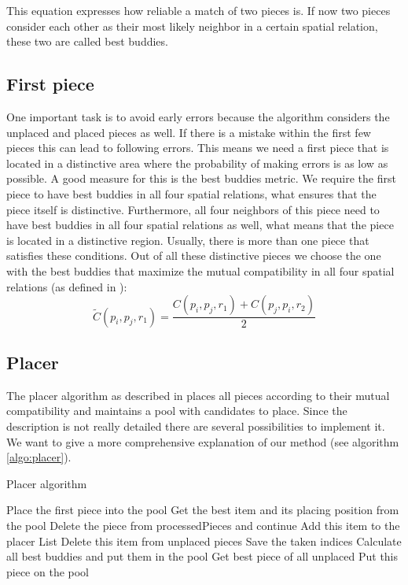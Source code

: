 \documentclass[11pt]{report}
\begin{document}
This equation expresses how reliable a match of two pieces is. If now two pieces consider each other as their most likely neighbor in a certain spatial relation, these two are called best buddies.

\subsection{First piece}
One important task is to avoid early errors because the algorithm considers the unplaced and placed pieces as well. If there is a mistake within the first few pieces this can lead to following errors.
This means we need a first piece that is located in a distinctive area where the probability of making errors is as low as possible. A good measure for this is the best buddies metric. We require the first piece to have best buddies in all four spatial relations, what ensures that the piece itself is distinctive. Furthermore, all four neighbors of this piece need to have best buddies in all four spatial relations as well, what means that the piece is located in a distinctive region. 
Usually, there is more than one piece that satisfies these conditions. Out of all these distinctive pieces we choose the one with the best buddies that maximize the mutual compatibility in all four spatial relations (as defined in \cite{Paikin2015}):
\begin{equation}\label{eq:mutualComp}
\widetilde{C}(p_i,p_j,r_1) = \frac{C(p_i,p_j,r_1)+C(p_j,p_i,r_2)}{2}
\end{equation}

\subsection{Placer}
The placer algorithm as described in \cite{Paikin2015} places all pieces according to their mutual compatibility and maintains a pool with candidates to place. Since the description is not really detailed there are several possibilities to implement it. We want to give a more comprehensive explanation of our method (see algorithm \ref{algo:placer}).

\begin{algorithm}
	\caption{Placer algorithm}
	\label{algo:placer}
	\begin{algorithmic}
		\State Place the first piece into the pool
				\State Get the best item and its placing position from the pool
					\State Delete the piece from processedPieces and continue \EndIf
				\State Add this item to the placer List
				\State Delete this item from unplaced pieces
				\State Save the taken indices
				\State Calculate all best buddies and put them in the pool
			\EndWhile
		\State Get best piece of all unplaced
			\State Put this piece on the pool
		\EndIf
		\EndWhile
	\end{algorithmic}
\end{algorithm}
\end{document}
